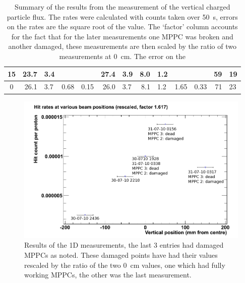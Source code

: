 \begin{table}
\begin{center}
\begin{tabular}{ c | r@{\( \pm \)}l | r@{\( \pm \)}l | r@{\( \pm \)}l | r@{\( \pm \)}l | r@{\( \pm \)}l | r@{\( \pm \)}l }
         15     &   23.7 & 3.4   &    &    &    27.4 & 3.9   &   8.0 & 1.2   &     &    &   59   & 19 \\
         \hline
          0     &   26.1 & 3.7   &   0.68 & 0.15   &    26.0 & 3.7   &   8.1 & 1.2   &    1.65 & 0.33   &   71   & 23 \\
    \end{tabular}
    \end{center}
    \caption{Summary of the results from the measurement of the vertical charged particle flux. The rates were calculated with counts taken over 50~s, errors on the rates are the square root of the value. The `factor' column accounts for the fact that for the later measurements one MPPC was broken and another damaged, these measurements are then scaled by the ratio of two measurements at 0~cm. The error on the }
    \label{label}
\end{table}

 \begin{figure}[hptb]
    \centering
        \includegraphics[width=.9\textwidth]{images/charged_flux/hit_rate_rescaled.png}
    \caption{Results of the 1D measurements, the last 3 entries had damaged MPPCs as noted. These damaged points have had their values rescaled by the ratio of the two 0~cm values, one which had fully working MPPCs, the other was the last measurement.}
    \label{fig:images_hit_rate_rescaled}
 \end{figure}
 
